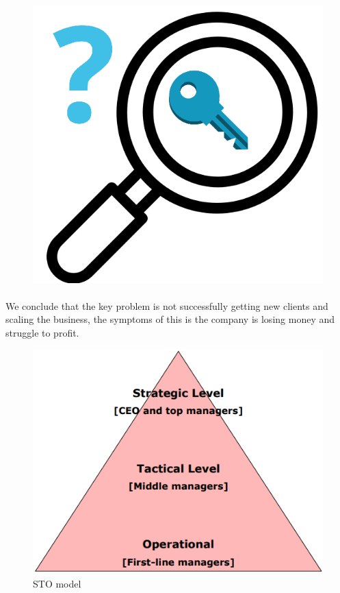 \begin{figure}
\centering
\includegraphics[scale=0.15]{figures/keyproblem.png}
\end{figure}
\paragraph{}

We conclude that the key problem is not successfully getting new clients and scaling the business, the symptoms of this is the company is losing money and struggle to profit.

\begin{figure}
\centering
\includegraphics[scale=0.3]{figures/strategicallevel.png}
\caption{STO model \newline \cite[p.42]{temostomodel}}
\label{stomodel}
\end{figure}
